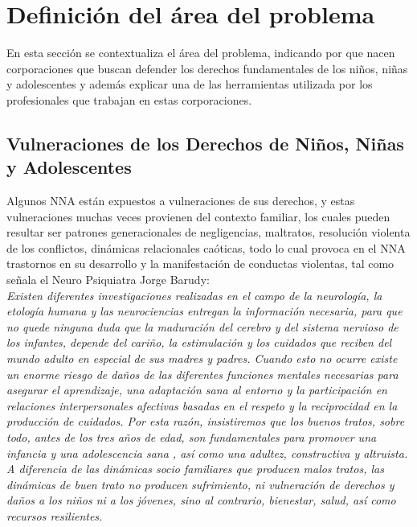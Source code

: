 \newpage
\section{Definición del área del problema} \label{contexto}
\vspace{2mm}
\normalsize

En esta sección se contextualiza el área del problema, indicando por que nacen corporaciones que buscan defender los derechos fundamentales de los niños, niñas y adolescentes y además explicar una de las herramientas utilizada por los profesionales que trabajan en estas corporaciones.


\subsection{Vulneraciones de los Derechos de Niños, Niñas y Adolescentes}
\label{vulneraciones}
\vspace{2mm}
\normalsize

Algunos NNA están expuestos a vulneraciones de sus derechos, y estas vulneraciones muchas veces provienen del contexto familiar, los cuales pueden resultar ser patrones generacionales de negligencias, maltratos, resolución violenta de los conflictos, dinámicas relacionales caóticas, todo lo cual provoca en el NNA trastornos en su desarrollo y la manifestación de conductas violentas, tal como señala el Neuro Psiquiatra Jorge Barudy:\\
\textit{Existen diferentes investigaciones realizadas en el campo de la neurología, la etología humana y las neurociencias entregan la información necesaria, para que no quede ninguna duda que la maduración del cerebro y del sistema nervioso de los infantes, depende del cariño, la estimulación y los cuidados que reciben del mundo adulto en especial de sus madres y padres. Cuando esto no ocurre existe un enorme riesgo de daños de las diferentes funciones mentales necesarias para asegurar el aprendizaje, una adaptación sana al entorno y la participación en relaciones interpersonales afectivas basadas en el respeto y la reciprocidad en la producción de cuidados. Por esta razón, insistiremos que los buenos tratos, sobre todo, antes de los tres años de edad, son fundamentales para promover una infancia y una adolescencia sana , así como una adultez, constructiva y altruista. A diferencia de las dinámicas socio familiares que producen malos tratos, las dinámicas de buen trato no producen sufrimiento, ni vulneración de derechos y daños a los niños ni a los jóvenes, sino al contrario, bienestar, salud, así como recursos resilientes.} \cite{REF1}\\

